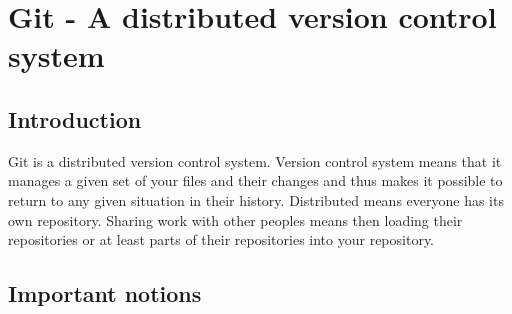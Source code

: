 \documentclass[a4paper,10pt]{scrartcl}
\begin{document}
\section*{Git - A distributed version control system}
\subsection*{Introduction}
Git is a distributed version control system. Version control system means that it manages a given set of your files and their changes and thus makes it possible to return to any given situation in their history. Distributed means everyone has its own repository. Sharing work with other peoples means then loading their repositories or at least parts of their repositories into your repository.
\subsection*{Important notions}
\end{document}

